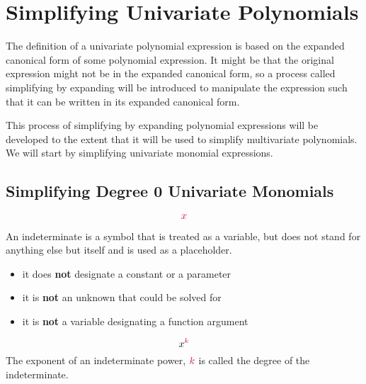 \documentclass[20150903-160354-rs2.2-MarksMathNotebook.tex]{subfiles}
\begin{document}
%
%

\chapter{Simplifying Univariate Polynomials}

The definition of a univariate polynomial expression is based on the expanded canonical form of some polynomial expression.  It might be that the original expression might not be in the expanded canonical form, so a process called \alert{simplifying by expanding} will be introduced to manipulate the expression such that it can be written in its expanded canonical form.

This process of simplifying by expanding polynomial expressions will be developed to the extent that it will be used to simplify multivariate polynomials.  We will start by simplifying univariate monomial expressions.


\section{Simplifying Degree 0 Univariate Monomials}

\begin{definition}[Indeterminate]

\[
\cRed{x}
\]

An indeterminate is a symbol that is treated as a variable, but does not stand for anything else but itself and is used as a placeholder.

\begin{itemize}
	\item it does \textbf{not} designate a constant or a parameter
	\item it is \textbf{not} an unknown that could be solved for
	\item it is \textbf{not} a variable designating a function argument
\end{itemize}

\hfill \cite{wikipedia:indeterminate}
\end{definition}

\begin{definition}

\[
x^{\cRed{k}}
\]
The exponent of an indeterminate power, $\cRed{k}$ is called the degree of the indeterminate.

\hfill \textcite{wikipedia:polynomial}
\end{definition}
\end{document}
